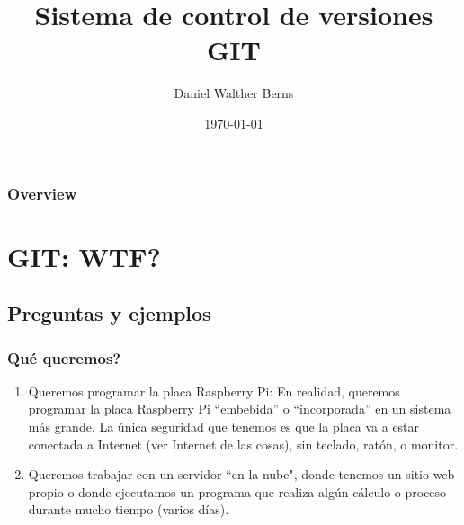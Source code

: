 \documentclass{beamer}
\title[GIT]{Sistema de control de versiones GIT} %
\author{Daniel Walther Berns} %
\institute[FI-UNPSJB] %
{
Departamento de Ingenier\'{\i}a Electr\'{o}nica - Facultad de Ingenier\'{\i}a 

\medskip

Universidad Nacional de la Patagonia San Juan Bosco \\ %

\medskip
\textit{daniel.w.berns@gmail.com} %
}
\date{\today} %
\begin{document}
\begin{frame}
\titlepage %
\end{frame}

\begin{frame}
\frametitle{Overview} %
\tableofcontents %
\end{frame}


\section{GIT: WTF?} 


\subsection{Preguntas y ejemplos} %

\begin{frame}
\frametitle{\textquestiondown Qu\'{e} queremos?}

\begin{enumerate}
\item<1-> Queremos programar la placa Raspberry Pi: En realidad, queremos programar la placa Raspberry Pi ``embebida'' o ``incorporada'' en un sistema m\'{a}s grande. La \'{u}nica seguridad que tenemos es que la placa va a estar conectada a Internet (ver Internet de las cosas), sin teclado, rat\'{o}n, o monitor. 
\item<2-> Queremos trabajar con un servidor ``en la nube", donde tenemos un sitio web propio o donde ejecutamos un programa que realiza algún cálculo o proceso durante mucho tiempo (varios días).
\end{enumerate}
\end{frame}
\end{document}
